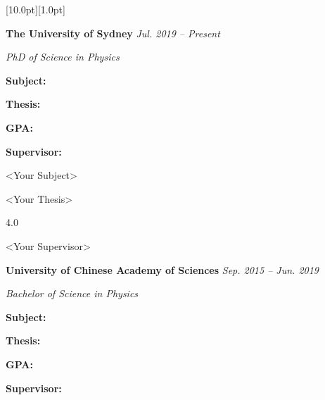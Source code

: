 \documentclass[12pt,a4paper,utf8]{report}
\begin{document}
\begin{minipage}[t]{16cm}
    \colorbox{subtitlecolor}{\raisebox{0pt}[10.0pt][1.0pt]{
        \textcolor{white}{\textsf{}}}}
\end{minipage}\par
\vspace{0.2cm}\hspace{0.5cm}
\begin{minipage}[t]{15.0cm}
    {{\textbf{The University of Sydney}}}\hfill
    {\em{Jul. 2019 -- Present}}\par\vspace{0.1cm}
    {\qquad\em{PhD of Science in Physics}}\par
\end{minipage}\par
\vspace{0.1cm}
    \begin{minipage}[t]{4cm}
        \qquad \textbf{Subject:}\par
        \qquad \textbf{Thesis:}\par
        \qquad \textbf{GPA:}\par
        \qquad \textbf{Supervisor:}\par
    \end{minipage}
    \begin{minipage}[t]{11cm}
        \textless Your Subject\textgreater \par
        \textless Your Thesis\textgreater \par
        4.0 \par
        \textless Your Supervisor\textgreater \par
    \end{minipage}\par
\vspace{0.2cm}\hspace{0.5cm}
\begin{minipage}[t]{15.0cm}
    {{\textbf{University of Chinese Academy of Sciences}}}\hfill
    {\em{Sep. 2015 -- Jun. 2019}}\par\vspace{0.1cm}
    {\qquad\em{Bachelor of Science in Physics}}\par
\end{minipage}\par
\vspace{0.1cm}
    \begin{minipage}[t]{4cm}
        \qquad \textbf{Subject:}\par
        \qquad \textbf{Thesis:}\par
        \qquad \textbf{GPA:}\par
        \qquad \textbf{Supervisor:}\par
    \end{minipage}
\end{document}
